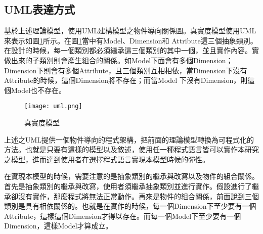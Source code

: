\subsection{UML表達方式}
基於上述理論模型，使用UML建構模型之物件導向關係圖。真實度模型使用UML來表示如圖\ref{uml}所示。在圖\ref{uml}當中有Model、Dimension和 Attribute這三個抽象類別。在設計的時候，每一個類別都必須繼承這三個類別的其中一個，並且實作內容。實做出來的子類別則會產生組合的關係。如Model下面會有多個Dimension；Dimension下則會有多個Attribute，且三個類別互相相依，當Dimension下沒有Attribute的時候，這個Dimension將不存在；而當Model 下沒有Dimension，則這個Model也不存在。

\begin{figure}[H]
\centering
\graphicspath{{/Users/FUDA/Documents/masterThesis/image/}}
\texttt{[image: uml.png]}
\caption{真實度模型}
\label{uml}
\end{figure}

上述之UML提供一個物件導向的程式架構，把前面的理論模型轉換為可程式化的方法。也就是只要有這樣的模型以及敘述，使用任一種程式語言皆可以實作本研究之模型，進而達到使用者在選擇程式語言實現本模型時候的彈性。\\\par

在實現本模型的時候，需要注意的是抽象類別的繼承與改寫以及物件的組合關係。首先是抽象類別的繼承與改寫，使用者須繼承抽象類別並進行實作。假設進行了繼承卻沒有實作，那麼程式將無法正常動作。再來是物件的組合關係，前面說到三個類別是具有相依關係的。也就是在實作的時候，每一個Dimension下至少要有一個Attribute，這樣這個Dimension才得以存在。而每一個Model下至少要有一個Dimension，這樣Model才算成立。